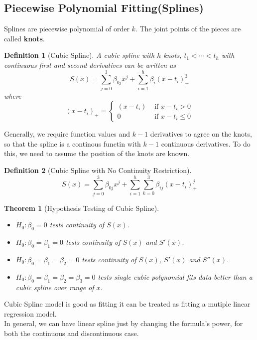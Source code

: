 \documentclass[11pt]{article}
\newtheorem{definition}{Definition}[section]
\newtheorem{theorem}{Theorem}[section]
\theoremstyle{definition}
\begin{document}
\subsection{Piecewise Polynomial Fitting(Splines)}
Splines are piecewise polynomial of order $k$. The joint points of the pieces are called \textbf{knots}.
\begin{definition}[Cubic Spline]
\normalfont A cubic spline with $h$ knots, $t_1<\cdots<t_h$ with continuous first and second derivatives can be written as
\[
S(x)=\sum_{j=0}^3\beta_{0j}x^j+\sum_{i=1}^h\beta_i(x-t_i)_{+}^3
\]
where
\[
(x-t_i)_{+}=\begin{cases}
(x-t_i)&\text{ if }x-t_i>0\\
0&\text{ if }x-t_i\leq 0
\end{cases}
\]
\end{definition}
Generally, we require function values and $k-1$ derivatives to agree on the knots, so that the spline is a continous functin with $k-1$ continuous derivatives. To do this, we need to assume the position of the knots are known.\\
\begin{definition}[Cubic Spline with No Continuity Restriction]
\normalfont 
\[
S(x)=\sum_{j=0}^3 \beta_{0j}x^j+\sum_{i=1}^h\sum_{k=0}^3\beta_{ij}(x-t_i)_{+}^j
\]
\end{definition}
\begin{theorem}[Hypothesis Testing of Cubic Spline]
\normalfont 
\begin{itemize}
  \item $H_0:\beta_0=0$ tests continuity of $S(x)$.
  \item $H_0:\beta_0=\beta_1=0$ tests continuity of $S(x)$ and $S'(x)$.
  \item $H_0:\beta_0=\beta_1=\beta_2=0$ tests continuity of $S(x)$, $S'(x)$ and $S''(x)$.
  \item $H_0:\beta_0=\beta_1=\beta_2=\beta_3=0$ tests single cubic polynomial fits data better than a cubic spline over range of $x$.
\end{itemize}
\end{theorem}
Cubic Spline model is good as fitting it can be treated as fitting a mutiple linear regression model.\\
In general, we can have linear spline just by changing the formula's power, for both the continuous and discontinuous case.
\end{document}
